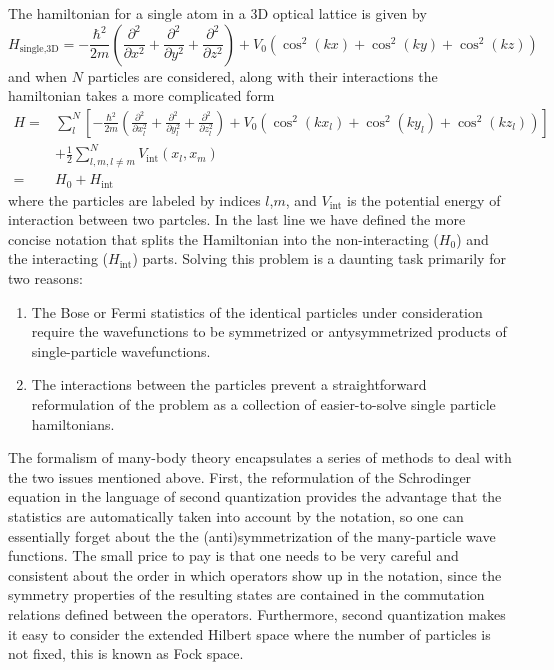 \documentclass[11pt,letter]{article}
\newcommand{\vo}{\ensuremath{V_{0}}}
\begin{document}
The hamiltonian for a single atom in a 3D
optical lattice is given by  
\begin{equation}
  H_{\text{single,3D}} = - \frac{\hbar^{2}}{2m} \left( \frac{\partial^{2}}{\partial x^{2}}
                            + \frac{\partial^{2}}{\partial y^{2}}
                            + \frac{\partial^{2}}{\partial z^{2}} \right)
 + \vo\left( \cos^{2}(kx)  + \cos^{2}(ky) + \cos^{2}(kz) \right)
\end{equation}
and when $N$ particles are considered, along with their interactions the hamiltonian takes a more complicated form 
\begin{equation}
\begin{split}
  H = & \sum_{l}^{N}\left[ -\frac{\hbar^{2}}{2m} \left( \frac{\partial^{2}}{\partial x_{l}^{2}}
                            + \frac{\partial^{2}}{\partial y_{l}^{2}}
                            + \frac{\partial^{2}}{\partial z_{l}^{2}} \right)
 + \vo\left( \cos^{2}(kx_{l})  + \cos^{2}(ky_{l}) + \cos^{2}(kz_{l}) \right) \right]\\
      &  + \frac{1}{2}\sum_{ l,m, l\neq m}^{N} V_{\mathrm{int}}(x_{l},x_{m} )\\ 
    = & H_{0} + H_{\text{int}}
 \label{eq:hubbard1st}
\end{split} 
\end{equation} 
where the particles are labeled by indices $l$,$m$, and
$V_{\mathrm{int}}$ is the potential energy of interaction between two partcles.
In the last line we have defined the more concise notation that splits the
Hamiltonian into the non-interacting ($H_{0}$) and the interacting ($H_{\text{int}}$) parts. Solving this
problem is a daunting task primarily for two reasons:
\begin{enumerate}
    \item The Bose or Fermi statistics of the identical particles under consideration require the wavefunctions to be symmetrized or antysymmetrized products of single-particle wavefunctions.     \item The interactions between the particles prevent a straightforward reformulation of the problem as a collection of easier-to-solve single particle hamiltonians.  
\end{enumerate}

The formalism of many-body theory encapsulates a series of methods to deal with
the two issues mentioned above.   First, the reformulation of the Schrodinger
equation in the language of second quantization provides the advantage that the
statistics are automatically taken into account by the notation, so one can
essentially forget about the the (anti)symmetrization of the many-particle wave
functions.  The small price to pay is that one needs to be very careful and
consistent about the order in which operators show up in the notation, since
the symmetry properties of the resulting states are contained in the
commutation relations defined between the operators.  Furthermore, second
quantization makes it easy to consider the extended Hilbert space where the
number of particles is not fixed, this is known as Fock space. 
\end{document}
